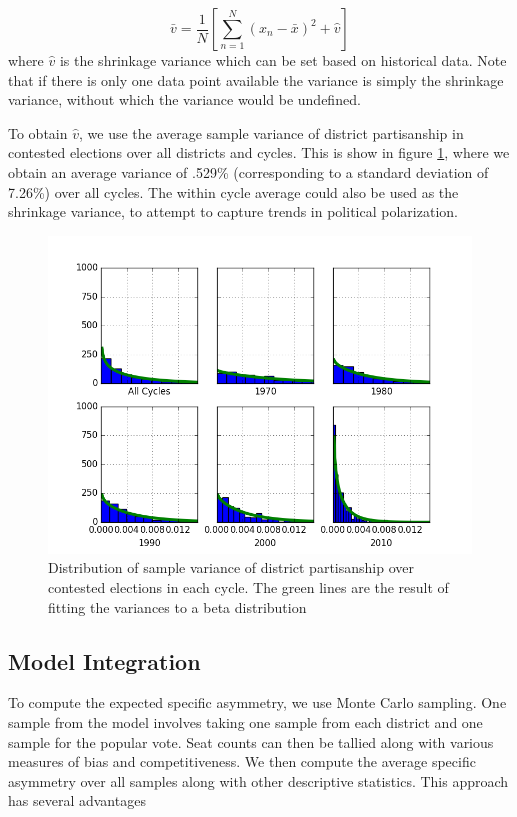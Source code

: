 \documentclass[preprint,12pt]{article}
\begin{document}
\begin{equation}
    \bar{v} = \frac{1}{N}\left[\sum_{n=1}^{N}\left(x_{n}-\bar{x}\right)^{2}+\hat{v}\right]
\end{equation}
where $\hat{v}$ is the shrinkage variance which can be set based on historical data.
Note that if there is only one data point available the variance is simply the shrinkage variance, without which the variance would be undefined.

To obtain $\hat{v}$, we use the average sample variance of district partisanship in contested elections over all districts and cycles.
This is show in figure \ref{fig:varHist}, where we obtain an average variance of .529\% (corresponding to a standard deviation of 7.26\%) over all cycles.
The within cycle average could also be used as the shrinkage variance, to attempt to capture trends in political polarization.

\begin{figure}[htb!]
    \begin{center}
        \includegraphics[scale=0.8]{../Figures/HistoricAsymmetry/VarHist.png}
        \caption{Distribution of sample variance of district partisanship over contested elections in each cycle. The green lines are the result of fitting the variances to a beta distribution}\label{fig:varHist}
    \end{center}
\end{figure}
\subsection{Model Integration}
To compute the expected specific asymmetry, we use Monte Carlo sampling.
One sample from the model involves taking one sample from each district and one sample for the popular vote.
Seat counts can then be tallied along with various measures of bias and competitiveness.
We then compute the average specific asymmetry over all samples along with other descriptive statistics.
This approach has several advantages
\end{document}
